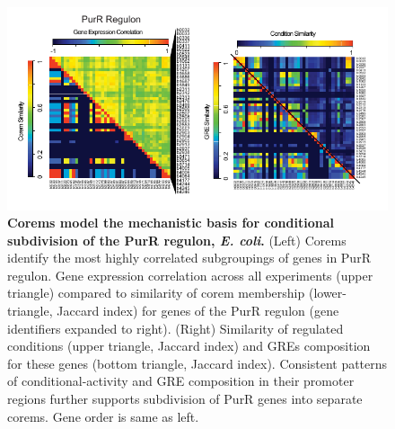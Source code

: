 \begin{figure}[hp]
\centering
\includegraphics[width=0.95\linewidth]{figures/purR_heatmap.pdf}
\caption[Corems model the mechanistic basis for conditional subdivision of the PurR regulon, \textit{E. coli}]{\textbf{Corems model the mechanistic basis for conditional subdivision of the PurR regulon, \textit{E. coli}.} (Left) Corems identify the most highly correlated subgroupings of genes in PurR regulon. Gene expression correlation across all experiments (upper triangle) compared to similarity of corem membership (lower-triangle, Jaccard index) for genes of the PurR regulon (gene identifiers expanded to right). (Right) Similarity of regulated conditions (upper triangle, Jaccard index) and GREs composition for these genes (bottom triangle, Jaccard index). Consistent patterns of conditional-activity and GRE composition in their promoter regions further supports subdivision of PurR genes into separate corems. Gene order is same as left.}
\label{fig:purR_heatmap}
\end{figure}

